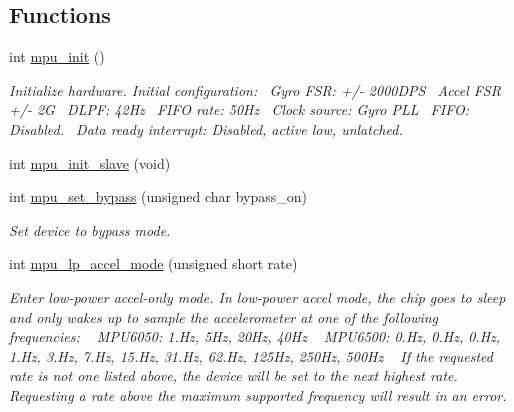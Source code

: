 \subsection*{Functions}
\begin{DoxyCompactItemize}
\item 
int \hyperlink{group___d_r_i_v_e_r_s_ga63637cf3771995aeda99d91d5f345f29}{mpu\+\_\+init} ()
\begin{DoxyCompactList}\small\item\em Initialize hardware. Initial configuration\+:~\newline
Gyro F\+SR\+: +/-\/ 2000\+D\+PS~\newline
Accel F\+SR +/-\/ 2G~\newline
D\+L\+PF\+: 42\+Hz~\newline
F\+I\+FO rate\+: 50\+Hz~\newline
Clock source\+: Gyro P\+LL~\newline
F\+I\+FO\+: Disabled.~\newline
Data ready interrupt\+: Disabled, active low, unlatched. \end{DoxyCompactList}\item 
int \hyperlink{group___d_r_i_v_e_r_s_ga9093183fe619360b3b1bfb8aab030592}{mpu\+\_\+init\+\_\+slave} (void)
\item 
int \hyperlink{group___d_r_i_v_e_r_s_ga36f70f38371b48d81094d3b061233e15}{mpu\+\_\+set\+\_\+bypass} (unsigned char bypass\+\_\+on)
\begin{DoxyCompactList}\small\item\em Set device to bypass mode. \end{DoxyCompactList}\item 
int \hyperlink{group___d_r_i_v_e_r_s_gabdcf10922a1a20f1b5bbd7576d3189b9}{mpu\+\_\+lp\+\_\+accel\+\_\+mode} (unsigned short rate)
\begin{DoxyCompactList}\small\item\em Enter low-\/power accel-\/only mode. In low-\/power accel mode, the chip goes to sleep and only wakes up to sample the accelerometer at one of the following frequencies\+: ~\newline
 M\+P\+U6050\+: 1.\+Hz, 5\+Hz, 20\+Hz, 40\+Hz ~\newline
 M\+P\+U6500\+: 0.\+Hz, 0.\+Hz, 0.\+Hz, 1.\+Hz, 3.\+Hz, 7.\+Hz, 15.\+Hz, 31.\+Hz, 62.\+Hz, 125\+Hz, 250\+Hz, 500\+Hz ~\newline
 If the requested rate is not one listed above, the device will be set to the next highest rate. Requesting a rate above the maximum supported frequency will result in an error. ~\newline

\end{DoxyCompactList}
\end{DoxyCompactItemize}
